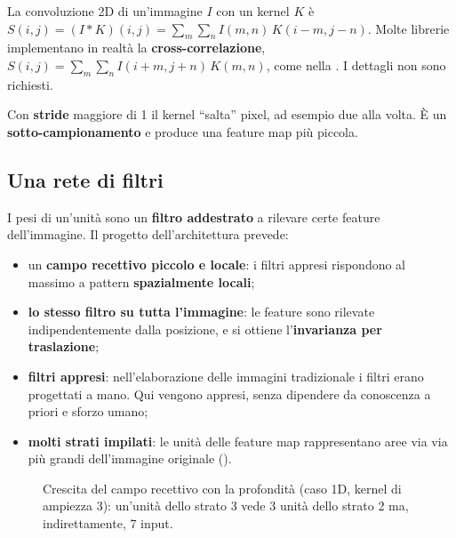 \begin{attenzione}
La convoluzione 2D di un'immagine $I$ con un kernel $K$ è $S(i,j) = (I*K)(i,j) = \sum_m\sum_nI(m,n)\,K(i-m,j-n)$.
Molte librerie implementano in realtà la \textbf{cross-correlazione}, $S(i,j) = \sum_m\sum_nI(i+m,j+n)\,K(m,n)$,
come nella . I dettagli non sono richiesti.
\end{attenzione}

Con \textbf{stride} maggiore di 1 il kernel ``salta'' pixel, ad esempio due alla volta. È un
\textbf{sotto-campionamento} e produce una feature map più piccola.

\subsection{Una rete di filtri}

I pesi di un'unità sono un \textbf{filtro addestrato} a rilevare certe feature dell'immagine. Il progetto
dell'architettura prevede:
\begin{itemize}
  \item un \textbf{campo recettivo piccolo e locale}: i filtri appresi rispondono al massimo a pattern
        \textbf{spazialmente locali};
  \item \textbf{lo stesso filtro su tutta l'immagine}: le feature sono rilevate indipendentemente dalla posizione, e
        si ottiene l'\textbf{invarianza per traslazione};
  \item \textbf{filtri appresi}: nell'elaborazione delle immagini tradizionale i filtri erano progettati a mano.
        Qui vengono appresi, senza dipendere da conoscenza a priori e sforzo umano;
  \item \textbf{molti strati impilati}: le unità delle feature map rappresentano aree via via più grandi
        dell'immagine originale ().
\end{itemize}

\begin{figure}[ht]
\centering
{}
\caption{Crescita del campo recettivo con la profondità (caso 1D, kernel di ampiezza 3): un'unità dello strato 3 vede
3 unità dello strato 2 ma, indirettamente, 7 input.}
\label{fig:campo-recettivo}
\end{figure}

